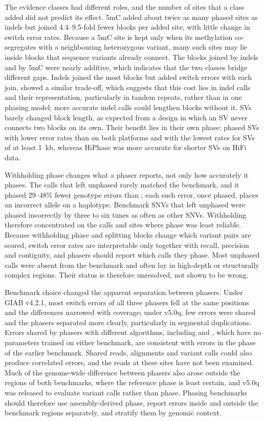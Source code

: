 The evidence classes had different roles, and the number of sites that a class added did not predict its effect. 5mC added about twice as many phased sites as indels but joined 4.4--9.5-fold fewer blocks per added site, with little change in switch error rates. Because a 5mC site is kept only when its methylation co-segregates with a neighbouring heterozygous variant, many such sites may lie inside blocks that sequence variants already connect. The blocks joined by indels and by 5mC were nearly additive, which indicates that the two classes bridge different gaps. Indels joined the most blocks but added switch errors with each join. \whatshap showed a similar trade-off, which suggests that this cost lies in indel calls and their representation, particularly in tandem repeats, rather than in one phasing model; more accurate indel calls\cite{zheng2026accelerated,kolesnikov2024local} could lengthen blocks without it. SVs barely changed block length, as expected from a design in which an SV never connects two blocks on its own. Their benefit lies in their own phase: \toolname phased SVs with lower error rates than \whatshap on both platforms and with the lowest rates for SVs of at least 1~kb, whereas HiPhase was more accurate for shorter SVs on HiFi data.

Withholding phase changes what a phaser reports, not only how accurately it phases. The calls that \toolname left unphased rarely matched the benchmark, and it phased 29--48\% fewer genotype errors than \whatshap; each such error, once phased, places an incorrect allele on a haplotype. Benchmark SNVs that \toolname left unphased were phased incorrectly by \whatshap three to six times as often as other SNVs. Withholding therefore concentrated on the calls and sites where phase was least reliable. Because withholding phase and splitting blocks change which variant pairs are scored, switch error rates are interpretable only together with recall, precision and contiguity, and phasers should report which calls they phase. Most unphased calls were absent from the benchmark and often lay in high-depth or structurally complex regions. Their status is therefore unresolved, not shown to be wrong.

Benchmark choice changed the apparent separation between phasers. Under GIAB v4.2.1, most switch errors of all three phasers fell at the same positions and the differences narrowed with coverage; under v5.0q, few errors were shared and the phasers separated more clearly, particularly in segmental duplications. Errors shared by phasers with different algorithms, including \whatshap and \hapcut, which have no parameters trained on either benchmark, are consistent with errors in the phase of the earlier benchmark. Shared reads, alignments and variant calls could also produce correlated errors, and the reads at these sites have not been examined. Much of the genome-wide difference between phasers also arose outside the regions of both benchmarks, where the reference phase is least certain, and v5.0q was released to evaluate variant calls rather than phase\cite{olson2026giabv5}. Phasing benchmarks should therefore use assembly-derived phase, report errors inside and outside the benchmark regions separately, and stratify them by genomic context\cite{dwarshuis2024stratifications}.

